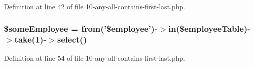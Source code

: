 \-Definition at line 42 of file 10-\/any-\/all-\/contains-\/first-\/last.\-php.

\hypertarget{_linq_to_zend_db_210-any-all-contains-first-last_8php_a4b9868169ba54fa01752fb9ad8b015c4}{
\subsubsection[{\$some\-Employee}]{\setlength{\rightskip}{0pt plus 5cm}\$some\-Employee = from('\$employee')-\/$>$in(\$employee\-Table)-\/$>$take(1)-\/$>${\bf select}()}}\label{_linq_to_zend_db_210-any-all-contains-first-last_8php_a4b9868169ba54fa01752fb9ad8b015c4}


\-Definition at line 54 of file 10-\/any-\/all-\/contains-\/first-\/last.\-php.

